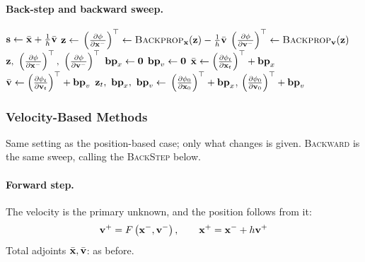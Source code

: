 \paragraph{Back-step and backward sweep.}
\begin{algorithm}[H]
\caption{Position-based: one back-step, and the sweep over all steps.}
\label{alg:npd_pb_backstep}
\begin{algorithmic}[1]
    \State $\mathbf{s} \gets \bar{\mathbf{x}} + \tfrac{1}{h}\bar{\mathbf{v}}$ 
    \State $\mathbf{z} \gets$  
    \State $\left(\frac{\partial \phi}{\partial \mathbf{x}^-}\right)^\top \gets \textsc{Backprop}_{\mathbf{x}}(\mathbf{z}) - \tfrac{1}{h}\bar{\mathbf{v}}$ 
    \State $\left(\frac{\partial \phi}{\partial \mathbf{v}^-}\right)^\top \gets \textsc{Backprop}_{\mathbf{v}}(\mathbf{z})$ 
    \State \Return $\z,\ \left(\pdc{\phi}{\x^-}\right)^\top,\ \left(\pdc{\phi}{\vv^-}\right)^\top$
\EndFunction
\Statex
{}
    \State $\mathbf{bp}_x \gets \mathbf{0}$
    \State $\mathbf{bp}_v \gets \mathbf{0}$
        \State $\bar{\mathbf{x}} \gets \left(\frac{\partial \phi_t}{\partial \mathbf{x}_t}\right)^\top + \mathbf{bp}_x$
        \State $\bar{\mathbf{v}} \gets \left(\frac{\partial \phi_t}{\partial \mathbf{v}_t}\right)^\top + \mathbf{bp}_v$
        \State $\mathbf{z}_t,\ \mathbf{bp}_x,\ \mathbf{bp}_v \gets$ 
    \EndFor
    \State \Return $\left(\frac{\partial \phi_0}{\partial \mathbf{x}_0}\right)^\top + \mathbf{bp}_x$, \quad $\left(\frac{\partial \phi_0}{\partial \mathbf{v}_0}\right)^\top + \mathbf{bp}_v$
\EndFunction
\end{algorithmic}
\end{algorithm}

\subsubsection{Velocity-Based Methods}
\label{sec:npd_seed_vel}

\noindent Same setting as the position-based case; only what changes is given. \textsc{Backward} is the same sweep, calling the \textsc{BackStep} below.

\paragraph{Forward step.} The velocity is the primary unknown, and the position follows from it:
\begin{equation*}
    \mathbf{v}^+ = F\left(\mathbf{x}^-, \mathbf{v}^-\right), \qquad \mathbf{x}^+ = \mathbf{x}^- + h\mathbf{v}^+
\end{equation*}
Total adjoints $\bar{\mathbf{x}}, \bar{\mathbf{v}}$: as before.

